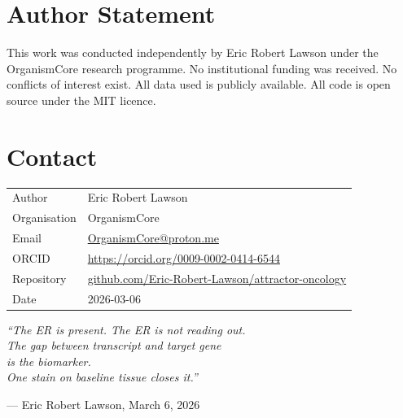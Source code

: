 \documentclass[12pt, a4paper]{article}
\begin{document}
\section*{Author Statement}

This work was conducted independently by Eric Robert
Lawson under the OrganismCore research programme. No
institutional funding was received. No conflicts of
interest exist. All data used is publicly available.
All code is open source under the MIT licence.

\section*{Contact}

\begin{tabular}{ll}
Author        & Eric Robert Lawson \\
Organisation  & OrganismCore \\
Email         &
  \href{mailto:OrganismCore@proton.me}
       {OrganismCore@proton.me} \\
ORCID         &
  \href{https://orcid.org/0009-0002-0414-6544}
       {https://orcid.org/0009-0002-0414-6544} \\
Repository    &
  \href{https://github.com/Eric-Robert-Lawson/attractor-oncology}
       {github.com/Eric-Robert-Lawson/attractor-oncology} \\
Date          & 2026-03-06 \\
\end{tabular}

\vspace{2em}
\begin{center}
\itshape
``The ER is present. The ER is not reading out.\\
The gap between transcript and target gene\\
is the biomarker.\\
One stain on baseline tissue closes it.''

\medskip
\upshape
--- Eric Robert Lawson, March 6, 2026
\end{center}
\end{document}
